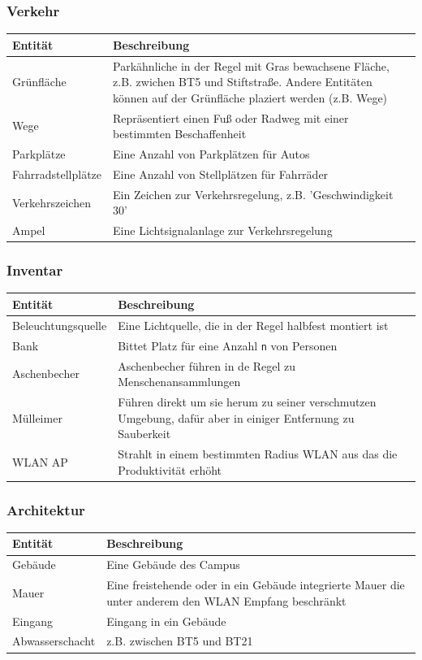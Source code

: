 \documentclass[10pt]{scrartcl}
\begin{document}
	\subsubsection{Verkehr}
\begin{longtable}{|p{}|p{}|}
\hline \textbf{Entität} & \textbf{Beschreibung} \\ 
\hline
\hline Grünfläche & Parkähnliche in der Regel mit Gras bewachsene Fläche, z.B. zwichen BT5 und Stiftstraße. Andere Entitäten können auf der Grünfläche plaziert werden (z.B. Wege) \\ 
\hline Wege & Repräsentiert einen Fuß oder Radweg mit einer bestimmten Beschaffenheit\\ 
\hline Parkplätze & Eine Anzahl von Parkplätzen für Autos\\ 
\hline Fahrradstellplätze & Eine Anzahl von Stellplätzen für Fahrräder \\ 
\hline Verkehrszeichen & Ein Zeichen zur Verkehrsregelung, z.B. 'Geschwindigkeit 30' \\ 
\hline Ampel & Eine Lichtsignalanlage zur Verkehrsregelung  \\ 
\hline 
\end{longtable}

	\subsubsection{Inventar}
\begin{longtable}{|p{}|p{}|}
\hline \textbf{Entität} & \textbf{Beschreibung} \\
\hline
\hline Beleuchtungsquelle & Eine Lichtquelle, die in der Regel halbfest montiert ist \\ 
\hline Bank & Bittet Platz für eine Anzahl \verb!n! von Personen \\ 
\hline Aschenbecher & Aschenbecher führen in de Regel zu Menschenansammlungen \\ 
\hline Mülleimer & Führen direkt um sie herum zu seiner verschmutzen Umgebung, dafür aber in einiger Entfernung zu Sauberkeit\\ 
\hline WLAN AP & Strahlt in einem bestimmten Radius WLAN aus das die Produktivität erhöht\\ 
\hline 
\end{longtable}

	\subsubsection{Architektur}
\begin{longtable}{|p{}|p{}|}
\hline \textbf{Entität} & \textbf{Beschreibung} \\
\hline	
\hline Gebäude & Eine Gebäude des Campus\\ 
\hline Mauer & Eine freistehende oder in ein Gebäude integrierte Mauer die unter anderem den WLAN Empfang beschränkt\\ 
\hline Eingang & Eingang in ein Gebäude \\ 
\hline Abwasserschacht & z.B. zwischen BT5 und BT21 \\ 
\hline 
\end{longtable}
\end{document}
